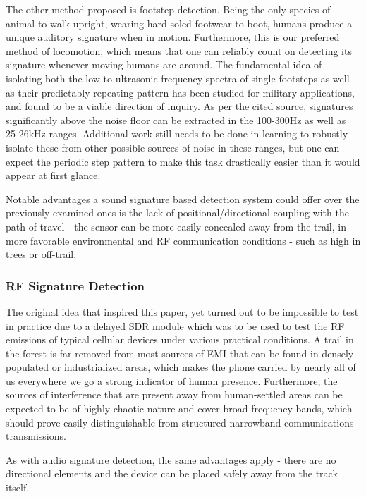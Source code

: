 \documentclass[10pt,nocopyrightspace]{ewsn-proc}
\begin{document}
The other method proposed is footstep detection. Being the only species of animal to walk upright, wearing hard-soled footwear to boot, humans produce a unique auditory signature when in motion. Furthermore, this is our preferred method of locomotion, which means that one can reliably count on detecting its signature whenever moving humans are around. The fundamental idea of isolating both the low-to-ultrasonic frequency spectra of single footsteps as well as their predictably repeating pattern has been studied for military applications\cite{NATOfootsteps}, and found to be a viable direction of inquiry. As per the cited source, signatures significantly above the noise floor can be extracted in the 100-300Hz as well as 25-26kHz ranges. Additional work still needs to be done in learning to robustly isolate these from other possible sources of noise in these ranges, but one can expect the periodic step pattern to make this task drastically easier than it would appear at first glance. 

Notable advantages a sound signature based detection system could offer over the previously examined ones is the lack of positional/directional coupling with the path of travel - the sensor can be more easily concealed away from the trail, in more favorable environmental and RF communication conditions - such as high in trees or off-trail.

\subsubsection{RF Signature Detection}
The original idea that inspired this paper, yet turned out to be impossible to test in practice due to a delayed SDR module which was to be used to test the RF emissions of typical cellular devices under various practical conditions. A trail in the forest is far removed from most sources of EMI that can be found in densely populated or industrialized areas, which makes the phone carried by nearly all of us everywhere we go a strong indicator of human presence. Furthermore, the sources of interference that are present away from human-settled areas can be expected to be of highly chaotic nature and cover broad frequency bands, which should prove easily distinguishable from structured narrowband communications transmissions.

As with audio signature detection, the same advantages apply - there are no directional elements and the device can be placed safely away from the track itself.
 
\end{document}
